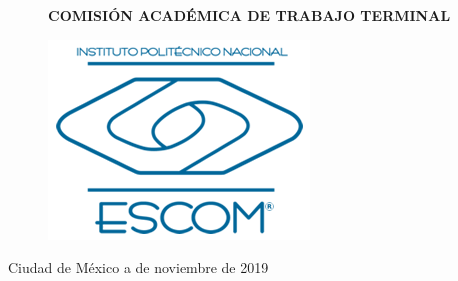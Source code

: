 \documentclass[12pt]{report}
\begin{document}
\begin{figure}[H]
\begin{minipage}[p] {0.55\linewidth}
\begin{center}
\begin{normalsize}
				\vspace*{0.1in}
				\textbf {COMISIÓN ACADÉMICA DE TRABAJO TERMINAL}\\
			\end{normalsize}
		\end{center}
	\end{minipage}
	\hspace{.85cm}
	\begin{minipage}[p]{0.20\linewidth}
		\centering
		\includegraphics[width=\linewidth]{images/logoESCOM}
	\end{minipage}
\end{figure}
\begin{flushright}
	Ciudad de México a   de noviembre de 2019
\end{flushright}
\vspace*{0.3in}
\end{document}
